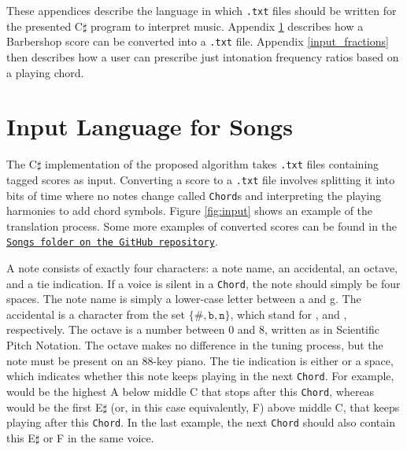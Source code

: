 \documentclass[a4paper]{article}
\begin{document}
\begin{appendices}
These appendices describe the language in which \texttt{.txt} files should be written for the presented C$\sharp$ program to interpret music. Appendix \ref{input_songs} describes how a Barbershop score can be converted into a \texttt{.txt} file. Appendix \ref{input_fractions} then describes how a user can prescribe just intonation frequency ratios based on a playing chord.

\section{Input Language for Songs}
\label{input_songs}
The C$\sharp$ implementation of the proposed algorithm takes \texttt{.txt} files containing tagged scores as input. Converting a score to a \texttt{.txt} file involves splitting it into bits of time where no notes change called \texttt{Chord}s and interpreting the playing harmonies to add chord symbols. Figure \ref{fig:input} shows an example of the translation process. Some more examples of converted scores can be found in the \texttt{\href{https://github.com/teuncb/AdaptiveBarbershop/tree/main/Songs}{Songs folder on the GitHub repository}}.

A note consists of exactly four characters: a note name, an accidental, an octave, and a tie indication. If a voice is silent in a \texttt{Chord}, the note should simply be four spaces. The note name is simply a lower-case letter between a and g. The accidental is a character from the set $\{\texttt{\#}, \texttt{b}, \texttt{n}\}$, which stand for ,  and , respectively. The octave is a number between 0 and 8, written as in Scientific Pitch Notation. \cite{pollens_pitch_2022} The octave makes no difference in the tuning process, but the note must be present on an 88-key piano. The tie indication is either  or a space, which indicates whether this note keeps playing in the next \texttt{Chord}. For example,  would be the highest A below middle C that stops after this \texttt{Chord}, whereas  would be the first E$\sharp$ (or, in this case equivalently, F) above middle C, that keeps playing after this \texttt{Chord}. In the last example, the next \texttt{Chord} should also contain this E$\sharp$ or F in the same voice.


\end{appendices}
\end{document}
